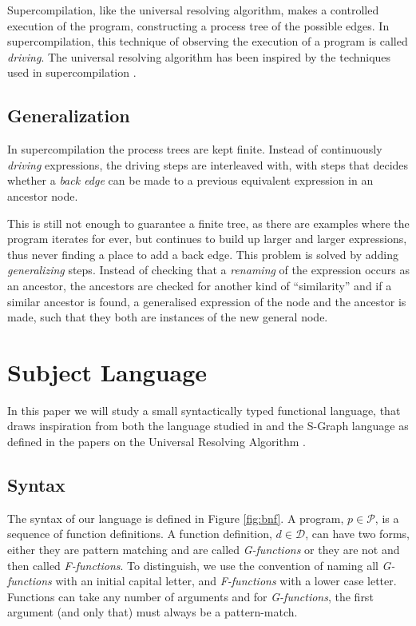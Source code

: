\documentclass[10pt]{../sigplanconf}
\begin{document}
Supercompilation, like the universal resolving algorithm, makes a
controlled execution of the program, constructing a process tree of
the possible edges. In supercompilation, this technique of observing
the execution of a program is called \textit{driving}. The universal
resolving algorithm has been inspired by the techniques used in
supercompilation \cite{abramov2002principles}.

\subsection{Generalization}
In supercompilation the process trees are kept finite. Instead of
continuously \textit{driving} expressions, the driving steps are
interleaved with, with steps that decides whether a \textit{back edge}
can be made to a previous equivalent expression in an ancestor node.

This is still not enough to guarantee a finite tree, as there are
examples where the program iterates for ever, but continues to build
up larger and larger expressions, thus never finding a place to add a
back edge. This problem is solved by adding \textit{generalizing}
steps. Instead of checking that a \textit{renaming} of the expression
occurs as an ancestor, the ancestors are checked for another kind of
``similarity'' and if a similar ancestor is found, a generalised
expression of the node and the ancestor is made, such that they both
are instances of the new general node.

\section{Subject Language}
\label{sec:trfl}
In this paper we will study a small syntactically typed functional
language, that draws inspiration from both the language studied in
\cite{sorensen1998introduction} and the S-Graph language as defined in
the papers on the Universal Resolving Algorithm
\cite{abramov2000universal, abramov2002universal,
  abramov2002principles}.

\subsection{Syntax}
The syntax of our language is defined in Figure \ref{fig:bnf}. A
program, $p \in \mathcal{P}$, is a sequence of function definitions. A
function definition, $d \in \mathcal{D}$, can have two forms, either
they are pattern matching and are called \textit{G-functions} or they
are not and then called \textit{F-functions}. To distinguish, we use
the convention of naming all \textit{G-functions} with an initial
capital letter, and \textit{F-functions} with a lower case
letter. Functions can take any number of arguments and for
\textit{G-functions}, the first argument (and only that) must always
be a pattern-match.
\end{document}
